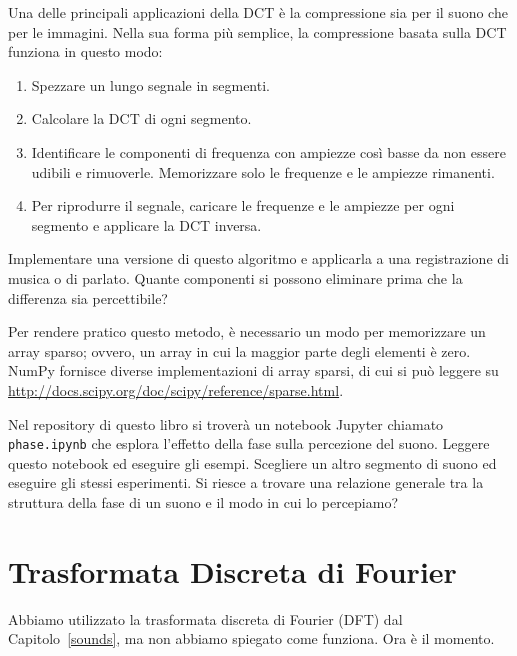 \documentclass[12pt]{book} \usepackage[width=5.5in,height=8.5in, hmarginratio=3:2,vmarginratio=1:1]{geometry}
\begin{document}
\begin{exercise} Una delle principali applicazioni della DCT è la compressione sia per il suono che per le immagini. Nella sua forma più semplice, la compressione basata sulla DCT funziona in questo modo:

\begin{enumerate} 

\item Spezzare un lungo segnale in segmenti.

\item Calcolare la DCT di ogni segmento.

\item Identificare le componenti di frequenza con ampiezze così basse da non essere udibili e rimuoverle. Memorizzare solo le frequenze e le ampiezze rimanenti.

\item Per riprodurre il segnale, caricare le frequenze e le ampiezze per ogni segmento e applicare la DCT inversa.

\end{enumerate} 

Implementare una versione di questo algoritmo e applicarla a una registrazione di musica o di parlato. Quante componenti si possono eliminare prima che la differenza sia percettibile?

Per rendere pratico questo metodo, è necessario un modo per memorizzare un array sparso; ovvero, un array in cui la maggior parte degli elementi è zero. NumPy fornisce diverse implementazioni di array sparsi, di cui si può leggere su \url{http://docs.scipy.org/doc/scipy/reference/sparse.html}. \end{exercise} 

\begin{exercise} Nel repository di questo libro si troverà un notebook Jupyter chiamato \verb"phase.ipynb" che esplora l'effetto della fase sulla percezione del suono. Leggere questo notebook ed eseguire gli esempi. Scegliere un altro segmento di suono ed eseguire gli stessi esperimenti. Si riesce a trovare una relazione generale tra la struttura della fase di un suono e il modo in cui lo percepiamo? \end{exercise} 

\chapter{Trasformata Discreta di Fourier} \label{dft} 

Abbiamo utilizzato la trasformata discreta di Fourier (DFT) dal Capitolo~\ref{sounds}, ma non abbiamo spiegato come funziona. Ora è il momento.
\end{document}
